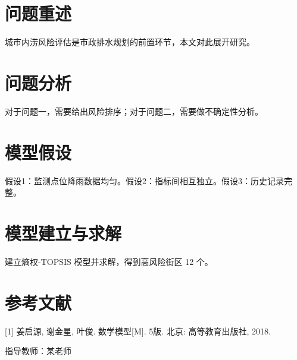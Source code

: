 \documentclass[12pt]{article}
\begin{document}
\begin{abstract}
本文研究了城市内涝问题，建立了相应的数学模型并对结果进行了分析。

\noindent 关键词：城市内涝；数学建模
\end{abstract}

\section{问题重述}
城市内涝风险评估是市政排水规划的前置环节，本文对此展开研究。

\section{问题分析}
对于问题一，需要给出风险排序；对于问题二，需要做不确定性分析。

\section{模型假设}
假设1：监测点位降雨数据均匀。假设2：指标间相互独立。假设3：历史记录完整。

\section{模型建立与求解}
建立熵权-TOPSIS 模型并求解，得到高风险街区 12 个。

\section{参考文献}
[1] 姜启源, 谢金星, 叶俊. 数学模型[M]. 5版. 北京: 高等教育出版社, 2018.

指导教师：某老师
\end{document}
